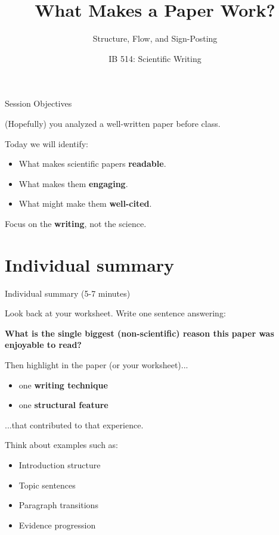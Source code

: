 \documentclass{beamer}
\title{What Makes a Paper Work?}
\subtitle{Structure, Flow, and Sign-Posting}
\author[]{IB 514: Scientific Writing}
\date{}
\begin{document}
\frame{\titlepage}


\begin{frame}{Session Objectives}

(Hopefully) you analyzed a well-written paper before class.

\vspace{0.5cm}

Today we will identify:

\begin{itemize}
\item What makes scientific papers \textbf{readable}.
\item What makes them \textbf{engaging}.
\item What might make them \textbf{well-cited}.
\end{itemize}

\vspace{0.5cm}

\center
Focus on the \textbf{writing}, not the science.
\vspace{0.5cm}
\scriptsize
\tableofcontents
\end{frame}


\section{Individual summary}
\begin{frame}{Individual summary (5-7 minutes)}

Look back at your worksheet.
Write one sentence answering:

\vspace{0.3cm}

\textbf{What is the single biggest (non-scientific) reason this paper was enjoyable to read?}

\vspace{0.5cm}

Then highlight in the paper (or your worksheet)...

\begin{itemize}
\item one \textbf{writing technique}
\item one \textbf{structural feature}
\end{itemize}

\hspace{2cm}...that contributed to that experience.


\vspace{0.5cm}

Think about examples such as:

\begin{itemize}
\item Introduction structure
\item Topic sentences
\item Paragraph transitions
\item Evidence progression
\end{itemize}

\end{frame}
\end{document}
